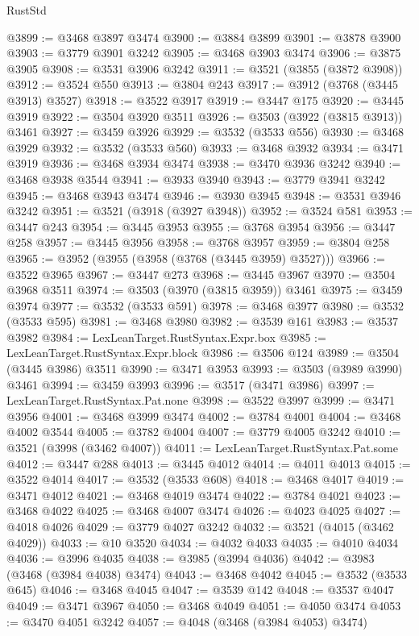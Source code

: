 \begin{lexlean}{RustStd}
\begin{coremodule}
@3899 := @3468 @3897 @3474
@3900 := @3884 @3899
@3901 := @3878 @3900
@3903 := @3779 @3901 @3242
@3905 := @3468 @3903 @3474
@3906 := @3875 @3905
@3908 := @3531 @3906 @3242
@3911 := @3521 (@3855 (@3872 @3908))
@3912 := @3524 @550
@3913 := @3804 @243
@3917 := @3912 (@3768 (@3445 @3913) @3527)
@3918 := @3522 @3917
@3919 := @3447 @175
@3920 := @3445 @3919
@3922 := @3504 @3920 @3511
@3926 := @3503 (@3922 (@3815 @3913)) @3461
@3927 := @3459 @3926
@3929 := @3532 (@3533 @556)
@3930 := @3468 @3929
@3932 := @3532 (@3533 @560)
@3933 := @3468 @3932
@3934 := @3471 @3919
@3936 := @3468 @3934 @3474
@3938 := @3470 @3936 @3242
@3940 := @3468 @3938 @3544
@3941 := @3933 @3940
@3943 := @3779 @3941 @3242
@3945 := @3468 @3943 @3474
@3946 := @3930 @3945
@3948 := @3531 @3946 @3242
@3951 := @3521 (@3918 (@3927 @3948))
@3952 := @3524 @581
@3953 := @3447 @243
@3954 := @3445 @3953
@3955 := @3768 @3954
@3956 := @3447 @258
@3957 := @3445 @3956
@3958 := @3768 @3957
@3959 := @3804 @258
@3965 := @3952 (@3955 (@3958 (@3768 (@3445 @3959) @3527)))
@3966 := @3522 @3965
@3967 := @3447 @273
@3968 := @3445 @3967
@3970 := @3504 @3968 @3511
@3974 := @3503 (@3970 (@3815 @3959)) @3461
@3975 := @3459 @3974
@3977 := @3532 (@3533 @591)
@3978 := @3468 @3977
@3980 := @3532 (@3533 @595)
@3981 := @3468 @3980
@3982 := @3539 @161
@3983 := @3537 @3982
@3984 := LexLeanTarget.RustSyntax.Expr.box
@3985 := LexLeanTarget.RustSyntax.Expr.block
@3986 := @3506 @124
@3989 := @3504 (@3445 @3986) @3511
@3990 := @3471 @3953
@3993 := @3503 (@3989 @3990) @3461
@3994 := @3459 @3993
@3996 := @3517 (@3471 @3986)
@3997 := LexLeanTarget.RustSyntax.Pat.none
@3998 := @3522 @3997
@3999 := @3471 @3956
@4001 := @3468 @3999 @3474
@4002 := @3784 @4001
@4004 := @3468 @4002 @3544
@4005 := @3782 @4004
@4007 := @3779 @4005 @3242
@4010 := @3521 (@3998 (@3462 @4007))
@4011 := LexLeanTarget.RustSyntax.Pat.some
@4012 := @3447 @288
@4013 := @3445 @4012
@4014 := @4011 @4013
@4015 := @3522 @4014
@4017 := @3532 (@3533 @608)
@4018 := @3468 @4017
@4019 := @3471 @4012
@4021 := @3468 @4019 @3474
@4022 := @3784 @4021
@4023 := @3468 @4022
@4025 := @3468 @4007 @3474
@4026 := @4023 @4025
@4027 := @4018 @4026
@4029 := @3779 @4027 @3242
@4032 := @3521 (@4015 (@3462 @4029))
@4033 := @10 @3520
@4034 := @4032 @4033
@4035 := @4010 @4034
@4036 := @3996 @4035
@4038 := @3985 (@3994 @4036)
@4042 := @3983 (@3468 (@3984 @4038) @3474)
@4043 := @3468 @4042
@4045 := @3532 (@3533 @645)
@4046 := @3468 @4045
@4047 := @3539 @142
@4048 := @3537 @4047
@4049 := @3471 @3967
@4050 := @3468 @4049
@4051 := @4050 @3474
@4053 := @3470 @4051 @3242
@4057 := @4048 (@3468 (@3984 @4053) @3474)

\end{coremodule}
\end{lexlean}
